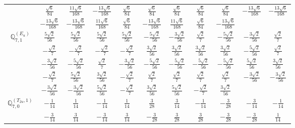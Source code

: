\documentclass[fleqn,10pt,landscape]{article}
\begin{document}
\begin{itemize}
{\begin{center}
\begin{longtable}{ccccccccccc}
& $ \frac{\sqrt{6}}{84} $ & $ \frac{11 \sqrt{6}}{168} $ & $ - \frac{13 \sqrt{6}}{168} $ & $ \frac{\sqrt{6}}{84} $ & $ \frac{\sqrt{6}}{84} $ & $ \frac{\sqrt{6}}{84} $ & $ \frac{\sqrt{6}}{84} $ & $ \frac{\sqrt{6}}{84} $ & $ - \frac{13 \sqrt{6}}{168} $ & $ - \frac{13 \sqrt{6}}{168} $ \\
& $ - \frac{13 \sqrt{6}}{168} $ & $ - \frac{13 \sqrt{6}}{168} $ & $ \frac{11 \sqrt{6}}{168} $ & $ \frac{\sqrt{6}}{84} $ & $ - \frac{13 \sqrt{6}}{168} $ & $ \frac{11 \sqrt{6}}{168} $ & $ \frac{\sqrt{6}}{84} $ & $ - \frac{13 \sqrt{6}}{168} $ & $  $ & $  $ \\ \hline
$\mathbb{Q}_{7,1}^{(E_{u})}$ & $ \frac{5 \sqrt{2}}{56} $ & $ \frac{5 \sqrt{2}}{56} $ & $ \frac{5 \sqrt{2}}{56} $ & $ \frac{5 \sqrt{2}}{56} $ & $ - \frac{5 \sqrt{2}}{56} $ & $ - \frac{3 \sqrt{2}}{56} $ & $ \frac{\sqrt{2}}{7} $ & $ - \frac{5 \sqrt{2}}{56} $ & $ - \frac{3 \sqrt{2}}{56} $ & $ \frac{\sqrt{2}}{7} $ \\
& $ - \frac{\sqrt{2}}{7} $ & $ - \frac{\sqrt{2}}{7} $ & $ - \frac{\sqrt{2}}{7} $ & $ - \frac{\sqrt{2}}{7} $ & $ \frac{3 \sqrt{2}}{56} $ & $ \frac{3 \sqrt{2}}{56} $ & $ \frac{3 \sqrt{2}}{56} $ & $ \frac{3 \sqrt{2}}{56} $ & $ - \frac{5 \sqrt{2}}{56} $ & $ \frac{\sqrt{2}}{7} $ \\
& $ - \frac{3 \sqrt{2}}{56} $ & $ - \frac{5 \sqrt{2}}{56} $ & $ \frac{\sqrt{2}}{7} $ & $ - \frac{3 \sqrt{2}}{56} $ & $ - \frac{5 \sqrt{2}}{56} $ & $ - \frac{5 \sqrt{2}}{56} $ & $ - \frac{5 \sqrt{2}}{56} $ & $ - \frac{5 \sqrt{2}}{56} $ & $ \frac{5 \sqrt{2}}{56} $ & $ \frac{3 \sqrt{2}}{56} $ \\
& $ - \frac{\sqrt{2}}{7} $ & $ \frac{5 \sqrt{2}}{56} $ & $ \frac{3 \sqrt{2}}{56} $ & $ - \frac{\sqrt{2}}{7} $ & $ \frac{\sqrt{2}}{7} $ & $ \frac{\sqrt{2}}{7} $ & $ \frac{\sqrt{2}}{7} $ & $ \frac{\sqrt{2}}{7} $ & $ - \frac{3 \sqrt{2}}{56} $ & $ - \frac{3 \sqrt{2}}{56} $ \\
& $ - \frac{3 \sqrt{2}}{56} $ & $ - \frac{3 \sqrt{2}}{56} $ & $ \frac{5 \sqrt{2}}{56} $ & $ - \frac{\sqrt{2}}{7} $ & $ \frac{3 \sqrt{2}}{56} $ & $ \frac{5 \sqrt{2}}{56} $ & $ - \frac{\sqrt{2}}{7} $ & $ \frac{3 \sqrt{2}}{56} $ & $  $ & $  $ \\ \hline
$\mathbb{Q}_{7,0}^{(T_{2u},1)}$ & $ - \frac{1}{14} $ & $ \frac{1}{14} $ & $ - \frac{1}{14} $ & $ \frac{1}{14} $ & $ \frac{3}{28} $ & $ \frac{3}{14} $ & $ - \frac{1}{14} $ & $ - \frac{3}{28} $ & $ - \frac{3}{14} $ & $ - \frac{1}{14} $ \\
& $ - \frac{3}{14} $ & $ \frac{3}{14} $ & $ - \frac{3}{14} $ & $ \frac{3}{14} $ & $ - \frac{3}{28} $ & $ \frac{3}{28} $ & $ \frac{3}{28} $ & $ - \frac{3}{28} $ & $ - \frac{3}{28} $ & $ \frac{1}{14} $ \\

\end{longtable}
\end{center}}
\end{itemize}
\end{document}
